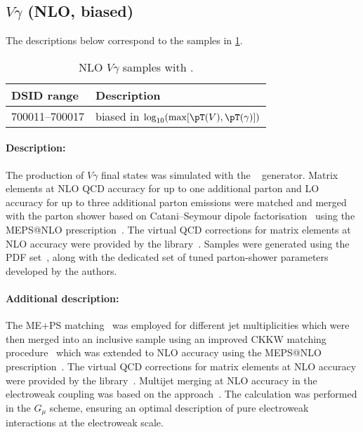 


\subsection[Vgamma (NLO, biased)]{$V\gamma$ (NLO, biased)}

The descriptions below correspond to the samples in
\cref{tab:MB-sherpa-vynlo-ew}.

\begin{table}[htbp]
  \caption{NLO $V\gamma$ samples with \SHERPA.}%
  \label{tab:MB-sherpa-vynlo-ew}
  \centering
  \begin{tabular}{l l}
    \toprule
    DSID range & Description \\
    \midrule
    700011--700017 & biased in $\log_{10}(\max[\pT(V), \pT(\gamma)])$\\
    \bottomrule
  \end{tabular}
\end{table}

\paragraph{Description:}

The production of $V\gamma$ final states was simulated with the
\SHERPA[2.2.8]~\cite{Bothmann:2019yzt} generator.  Matrix elements at
NLO QCD accuracy for up to one additional parton and LO accuracy for
up to three additional parton emissions were matched and merged with
the \SHERPA parton shower based on Catani--Seymour
dipole factorisation~\cite{Gleisberg:2008fv,Schumann:2007mg} using the MEPS@NLO
prescription~\cite{Hoeche:2011fd,Hoeche:2012yf,Catani:2001cc,Hoeche:2009rj}.
The virtual QCD corrections for matrix elements at NLO accuracy were provided by 
the \OPENLOOPS[2] library~\cite{Buccioni:2019sur,Cascioli:2011va,Buccioni:2017yxi,Denner:2016kdg}.
Samples were generated using the \NNPDF[3.0nnlo] PDF set~\cite{Ball:2014uwa}, along with
the dedicated set of tuned parton-shower parameters developed by the \SHERPA authors.


\paragraph{Additional description:}

The ME+PS matching~\cite{Hoeche:2011fd} was employed for different jet
multiplicities which were then merged into an inclusive sample 
using an improved CKKW matching
procedure~\cite{Catani:2001cc,Hoeche:2009rj} which was extended to NLO
accuracy using the MEPS@NLO prescription~\cite{Hoeche:2012yf}. 
The virtual QCD corrections for matrix elements at NLO accuracy were provided by 
the \OPENLOOPS[2] library~\cite{Buccioni:2019sur,Cascioli:2011va,Buccioni:2017yxi,Denner:2016kdg}.
Multijet merging at NLO accuracy in the electroweak coupling was based on 
the \NLOEWvirt approach~\cite{Kallweit:2014xda,Kallweit:2015dum}.
The calculation was performed in the $G_\mu$ scheme, ensuring an optimal 
description of pure electroweak interactions at the electroweak scale.

